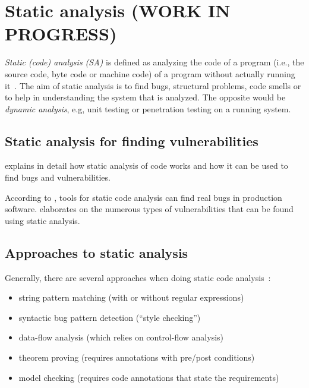 \chapter{Static analysis (WORK IN PROGRESS)}
\label{static-analysis}

\emph{Static (code) analysis (SA)} is defined as analyzing the code of a program (i.e., the source code, byte code or machine code) of a program without actually running it~\cite{chess-west}. The aim of static analysis is to find bugs, structural problems, code smells or to help in understanding the system that is analyzed. The opposite would be \emph{dynamic analysis}, e.g, unit testing or penetration testing on a running system.

\section{Static analysis for finding vulnerabilities}
\cite{chess-west} explains in detail how static analysis of code works and how it can be used to find bugs and vulnerabilities.

According to \cite{findbugs, evaluating}, tools for static code analysis can find real bugs in production software. \cite{coverity-report} elaborates on the numerous types of vulnerabilities that can be found using static analysis.

\section{Approaches to static analysis}
Generally, there are several approaches when doing static code analysis~\cite{comparison-of-bug-finding-tools, swaat, google-code-search}:

\begin{itemize}
 \item string pattern matching (with or without regular expressions)
 \item syntactic bug pattern detection (``style checking'')
 \item data-flow analysis (which relies on control-flow analysis) 
 \item theorem proving (requires annotations with pre/post conditions)
 \item model checking (requires code annotations that state the requirements)
\end{itemize}

